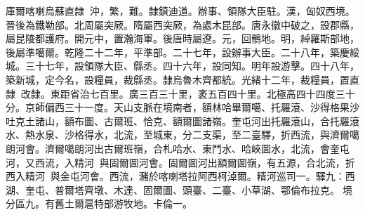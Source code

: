 \begin{pinyinscope}
庫爾喀喇烏蘇直隸：沖，繁，難。隸鎮迪道。辦事、領隊大臣駐。漢，匈奴西境。晉後為鐵勒部。北周屬突厥。隋屬西突厥，為處木昆部。唐永徽中破之，設郡縣，屬昆陵都護府。開元中，置瀚海軍。後唐時屬遼。元，回鶻地。明，綽羅斯部地，後屬準噶爾。乾隆二十二年，平準部。二十七年，設辦事大臣。二十八年，築慶綏城。三十七年，設領隊大臣、縣丞。四十六年，設同知。明年設游擊。四十八年，築新城，定今名，設糧員，裁縣丞。隸烏魯木齊都統。光緒十二年，裁糧員，置直隸，改隸。東距省治七百里。廣三百三十里，袤五百四十里。北極高四十四度三十分。京師偏西三十一度。天山支脈在境南者，額林哈畢爾噶、托羅滾、沙得格果沙吐克土諸山，額布圖、古爾班、恰克、額爾圖諸嶺。奎屯河出托羅滾山，合托羅滾水、熱水泉、沙格得水，北流，至城東，分二支渠，至二臺驛，折西流，與濟爾噶朗河會。濟爾噶朗河出古爾班嶺，合札哈水、東鬥水、哈峽圖水，北流，會奎屯河，又西流，入精河，與固爾圖河會。固爾圖河出額爾圖嶺，有五源，合北流，折西入精河，與金屯河會。西流，瀦於喀喇塔拉阿西柯淖爾。精河巡司一。驛九：西湖、奎屯、普爾塔齊墩、木達、固爾圖、頭臺、二臺、小草湖、鄂倫布拉克。境分區九。有舊土爾扈特部游牧地。卡倫一。


\end{pinyinscope}
